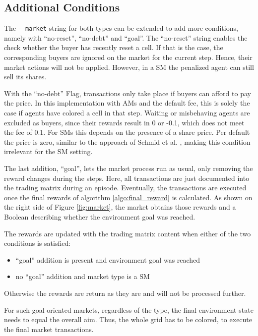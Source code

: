\subsection{Additional Conditions}\label{market_conditions}
The \verb|--market| string for both types can be extended to add more conditions, namely with ``no-reset'', ``no-debt'' and ``goal''. The ``no-reset'' string enables the check whether the buyer has recently reset a cell. If that is the case, the corresponding buyers are ignored on the market for the current step. Hence, their market actions will not be applied. However, in a SM the penalized agent can still sell its shares. 

With the ``no-debt'' Flag, transactions only take place if buyers can afford to pay the price. In this implementation with AMs and the default fee, this is solely the case if agents have colored a cell in that step. Waiting or misbehaving agents are excluded as buyers, since their rewards result in 0 or -0.1, which does not meet the fee of 0.1. For SMs this depends on the presence of a share price. Per default the price is zero, similar to the approach of Schmid et al. \cite{scbe21}, making this condition irrelevant for the SM setting.

The last addition, ``goal'', lets the market process run as usual, only removing the reward changes during the steps. Here, all transactions are just documented into the trading matrix during an episode. Eventually, the transactions are executed once the final rewards of algorithm \ref{algo:final_reward} is calculated. As shown on the right side of Figure \ref{fig:market}, the market obtains those rewards and a Boolean describing whether the environment goal was reached.

The rewards are updated with the trading matrix content when either of the two conditions is satisfied:
\begin{itemize}
    \item ``goal'' addition is present and environment goal was reached
    \item no ``goal'' addition and market type is a SM
\end{itemize}
Otherwise the rewards are return as they are and will not be processed further. 

For such goal oriented markets, regardless of the type, the final environment state needs to equal the overall aim. Thus, the whole grid has to be colored, to execute the final market transactions.

